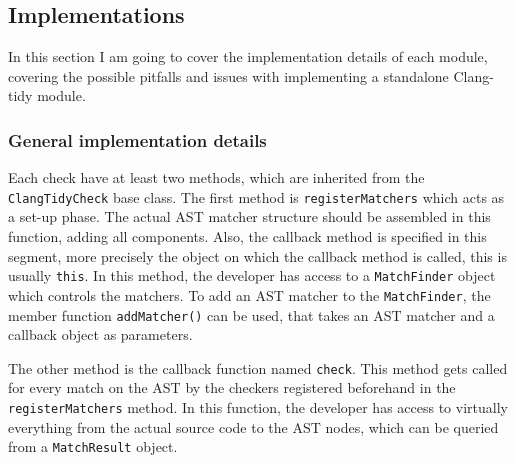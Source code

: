 \subsection{Implementations}
\par In this section I am going to cover the implementation details of each module, covering the possible pitfalls and issues with implementing a standalone Clang-tidy module.
\subsubsection{General implementation details}
\par Each check have at least two methods, which are inherited from the \verb|ClangTidyCheck| base class. The first method is \verb|registerMatchers| which acts as a set-up phase. The actual AST matcher structure should be assembled in this function, adding all components. Also, the callback method is specified in this segment, more precisely the object on which the callback method is called, this is usually \verb|this|. In this method, the developer has access to a \verb|MatchFinder| object which controls the matchers. To add an AST matcher to the \verb|MatchFinder|, the member function \verb|addMatcher()| can be used, that takes an AST matcher and a callback object as parameters. \medskip
\par The other method is the callback function named \verb|check|. This method gets called for every match on the AST by the checkers registered beforehand in the \verb|registerMatchers| method. In this function, the developer has access to virtually everything from the actual source code to the AST nodes, which can be queried from a \verb|MatchResult| object.
